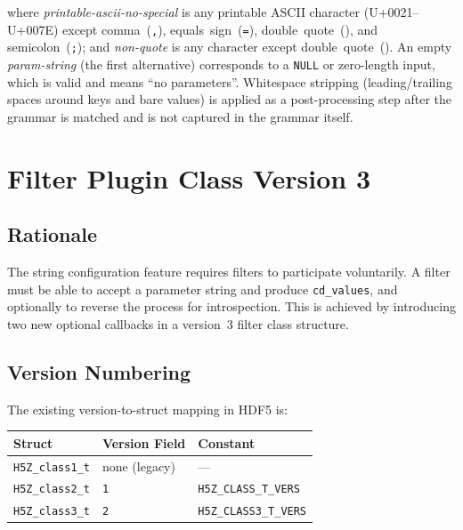 \documentclass[../HDF5_RFC.tex]{subfiles}
\begin{document}
\noindent
where \textit{printable-ascii-no-special} is any printable ASCII character
(U+0021--U+007E) except comma~(\texttt{,}), equals~sign~(\texttt{=}),
double~quote~(\texttt{\textquotedbl}), and semicolon~(\texttt{;});
and \textit{non-quote} is any character except double~quote~(\texttt{\textquotedbl}).
An empty \textit{param-string} (the first alternative) corresponds to a
\texttt{NULL} or zero-length input, which is valid and means ``no parameters''.
Whitespace stripping (leading/trailing spaces around keys and bare values)
is applied as a post-processing step after the grammar is matched and is
not captured in the grammar itself.


\section{Filter Plugin Class Version 3}
\label{sec:class3}

\subsection{Rationale}

The string configuration feature requires filters to participate voluntarily.
A filter must be able to accept a parameter string and produce \texttt{cd\_values},
and optionally to reverse the process for introspection. This is achieved by
introducing two new optional callbacks in a version~3 filter class structure.

\subsection{Version Numbering}
\label{sec:version-numbering}

The existing version-to-struct mapping in HDF5 is:

\begin{center}
\begin{tabular}{lll}
\toprule
\textbf{Struct} & \textbf{Version Field} & \textbf{Constant} \\
\midrule
\texttt{H5Z\_class1\_t} & none (legacy) & --- \\
\texttt{H5Z\_class2\_t} & \texttt{1} & \texttt{H5Z\_CLASS\_T\_VERS} \\
\texttt{H5Z\_class3\_t} & \texttt{2} & \texttt{H5Z\_CLASS3\_T\_VERS} \\
\bottomrule
\end{tabular}
\end{center}
\end{document}
